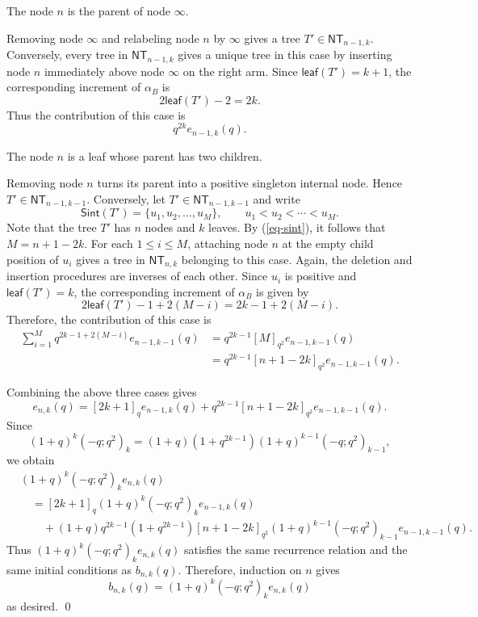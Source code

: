 \documentclass[12pt]{article}
\numberwithin{equation}{section}
\theoremstyle{plain}
\def\Sint{\mathsf{Sint}}
\def\leaf{\mathsf{leaf}}
\begin{document}
	 				 	\medskip
	 				 	 The node $n$ is the parent of node $\infty$.
	 				 	
	 				 	Removing node $\infty$ and relabeling node $n$ by $\infty$ gives a
	 				 	tree $T'\in\mathsf{NT}_{n-1,k}$. Conversely, every tree in
	 				 	$\mathsf{NT}_{n-1,k}$ gives a unique tree in this case by inserting
	 				 	node $n$ immediately above node $\infty$ on the right arm. Since
	 				 	$\leaf(T')=k+1$, the corresponding increment of $\alpha_B$ is
	 				 	\[
	 				 	2\leaf(T')-2=2k.
	 				 	\]
	 				 	Thus the contribution of this case  is
	 				 	\[
	 				 	q^{2k}e_{n-1,k}(q).
	 				 	\]
	 				 	
	 				 	\medskip
	 				 	 The node $n$ is a leaf whose parent has two
	 				 	children.
	 				 	
	 				 	Removing node $n$ turns its parent into a positive singleton internal
	 				 	node. Hence $T'\in\mathsf{NT}_{n-1,k-1}$. Conversely, let
	 				 	$T'\in\mathsf{NT}_{n-1,k-1}$ and write
	 				 	\[
	 				 	\Sint(T')=\{u_1,u_2,\ldots,u_M\},
	 				 	\qquad u_1<u_2<\cdots<u_M.
	 				 	\]
	 				 Note that 	the tree $T'$ has $n$ nodes and $k$ leaves.  By (\ref{eq-sint}), it follows that
	 				 $
	 				   M=n+1-2k.
	 				 	$
	 				 	For each $1\leq i\leq M$, attaching node $n$ at the empty child
	 				 	position of $u_i$ gives a tree in $\mathsf{NT}_{n,k}$ belonging to
	 				 	this case. Again, the deletion and insertion procedures are inverses
	 				 	 of each other. Since $u_i$ is positive and $\leaf(T')=k$, the
	 				 	corresponding increment of $\alpha_B$ is given by 
	 				 	\[
	 				 	2\leaf(T')-1+2(M-i)=2k-1+2(M-i).
	 				 	\]
	 				 	Therefore, the contribution of  this case  is
	 				 	\[
	 				 	\begin{aligned}
	 				 		\sum_{i=1}^{M}q^{2k-1+2(M-i)}e_{n-1,k-1}(q)
	 				 		&=q^{2k-1}[M]_{q^2}e_{n-1,k-1}(q)\\
	 				 		&=q^{2k-1}[n+1-2k]_{q^2}e_{n-1,k-1}(q).
	 				 	\end{aligned}
	 				 	\]
	 				 	
	 				 	  Combining
	 				 the above three  cases gives
	 				 	\[
	 				 	e_{n,k}(q)=[2k+1]_q e_{n-1,k}(q)
	 				 	+q^{2k-1}[n+1-2k]_{q^2}e_{n-1,k-1}(q).
	 				 	\]
	 				 	Since
	 				 	\[
	 				 	(1+q)^k(-q;q^2)_k
	 				 	=(1+q)(1+q^{2k-1})(1+q)^{k-1}(-q;q^2)_{k-1},
	 				 	\]
	 				 	we obtain
	 				 	\[
	 				 	\begin{aligned}
	 				 		&(1+q)^k(-q;q^2)_k e_{n,k}(q)\\
	 				 		&\quad=[2k+1]_q(1+q)^k(-q;q^2)_k e_{n-1,k}(q)\\
	 				 		&\qquad +(1+q)q^{2k-1}(1+q^{2k-1})[n+1-2k]_{q^2}
	 				 		(1+q)^{k-1}(-q;q^2)_{k-1}e_{n-1,k-1}(q).
	 				 	\end{aligned}
	 				 	\]
	 				 	Thus $(1+q)^k(-q;q^2)_k e_{n,k}(q)$ satisfies the same recurrence relation and the same initial conditions as
	 				 	$b_{n,k}(q)$.  Therefore, 
	 				 	induction on $n$ gives
	 				 	\[
	 				 	b_{n,k}(q)=(1+q)^k(-q;q^2)_k e_{n,k}(q)
	 				 	\]
	 				  as desired. \qed
	 				 
\end{document}
